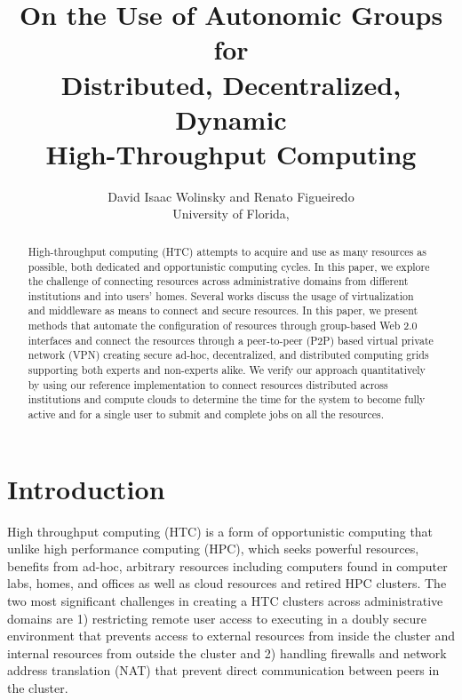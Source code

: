 \documentclass{sig-alternate}
\begin{document}
\title{On the Use of Autonomic Groups for\\
Distributed, Decentralized, Dynamic\\
High-Throughput Computing}

\author{
David Isaac Wolinsky and Renato Figueiredo
\\
University of Florida, 
\\
}

\maketitle

\begin{abstract}
High-throughput computing (HTC) attempts to acquire and use as many resources as
possible, both dedicated and opportunistic computing cycles.  In this paper, we
explore the challenge of connecting resources across administrative domains from
different institutions and into users' homes.  Several works discuss the usage
of virtualization and middleware as means to connect and secure resources.  In
this paper, we present methods that automate the configuration of resources
through group-based Web 2.0 interfaces and connect the resources through a
peer-to-peer (P2P) based virtual private network (VPN) creating secure ad-hoc,
decentralized, and distributed computing grids supporting both experts and
non-experts alike.  We verify our approach quantitatively by using our
reference implementation to connect resources distributed across institutions
and compute clouds to determine the time for the system to become fully active
and for a single user to submit and complete jobs on all the resources.
\end{abstract}

\section{Introduction}
High throughput computing (HTC) is a form of opportunistic computing that unlike
high performance computing (HPC), which seeks powerful resources, benefits from
ad-hoc, arbitrary resources including computers found in computer labs, homes,
and offices as well as cloud resources and retired HPC clusters.  The two most
significant challenges in creating a HTC clusters across administrative domains
are 1) restricting remote user access to executing in a doubly secure
environment that prevents access to external resources from inside the cluster
and internal resources from outside the cluster and 2) handling firewalls and
network address translation (NAT) that prevent direct communication between
peers in the cluster.
\end{document}
